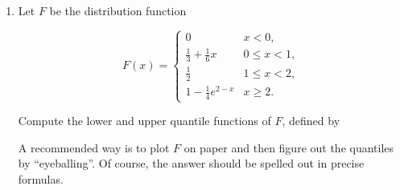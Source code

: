\documentclass[11pt]{report}
\newcommand{\fitwidth}[1]{%
  \sbox\fitbox{#1}%
  \ifdim\wd\fitbox>\linewidth\resizebox{\linewidth}{!}{\usebox\fitbox}\else\usebox\fitbox\fi}
\theoremstyle{plain}
\theoremstyle{definition}
\begin{document}
\begin{enumerate}[label=\arabic*.]
\[
\mathrm{P}\left(\bigcup_{k=1}^n A_k\right) = s_1 - s_2 + s_3 - s_4 + s_5 - \ldots + (-1)^{n-1} s_n,
\]

\noindent where

\begin{eqnarray*}
s_1 &=& \mathrm{P}(A_1) + \mathrm{P}(A_2) + \ldots + \mathrm{P}(A_n) = \sum_{k=1}^n \mathrm{P}(A_k), \\
s_2 &=& \sum_{1\le k_1 < k_2 \le n} \mathrm{P}(A_{k_1} \cap A_{k_2}), \\
s_3 &=& \sum_{1\le k_1 < k_2 < k_3 \le n} \mathrm{P}(A_{k_1} \cap A_{k_2} \cap A_{k_3}), \\
& \vdots &  \\
s_d &=& \sum_{1\le k_1 < \ldots< k_d \le n} \mathrm{P}(A_{k_1} \cap A_{k_2} \cap \ldots \cap A_{k_d}), \\
& \vdots &\\
s_n &=& \mathrm{P}(A_1 \cap A_2 \cap \ldots \cap A_n).
\end{eqnarray*}

\noindent (b) $N$ letters addressed to different people are
inserted at random into $N$ envelopes that are
labelled with the names and addresses of the $N$
recipients, such that all $N!$ possible matchings
between the letters and envelopes are equally likely.
What is the probability of the event that no letter
will arrive at its intended destination? Compute this
probability for any $N$, and in the limit when
$N\to\infty$.

\item Let $F$ be the distribution function

\[
F(x) = \begin{cases}
0 & x < 0, \\
\frac13 + \frac16 x & 0\le x < 1, \\
\frac12 & 1\le x < 2, \\
1-\frac14e^{2-x} & x\ge 2.
\end{cases}
\]

\noindent Compute the lower and upper quantile functions of $F$,
defined by

\begin{center}
\fitwidth{$\displaystyle
\begin{array}{ccc} X_*(p) &=& \sup \{ x : F(x) < p \}, \\
X^*(p) &=& \inf \{ x : F(x) > p \},
\end{array} \qquad\qquad (0<p<1).
$}
\end{center}

\noindent A recommended way is to plot $F$ on paper and then
figure out the quantiles by ``eyeballing''. Of course,
the answer should be spelled out in precise formulas.


\end{enumerate}
\end{document}
